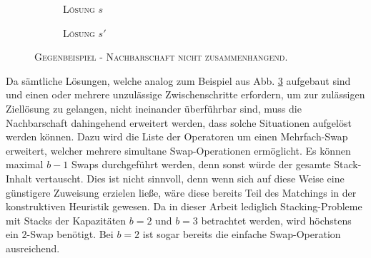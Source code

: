 \begin{figure}[H]
  \begin{subfigure}[b]{0.5\textwidth}
  \centering
    \caption{\textsc{Lösung $s$}}
    \label{fig:counter_a}
  \end{subfigure}
  \hfill
  \begin{subfigure}[b]{0.5\textwidth}
  \centering
    \caption{\textsc{Lösung $s'$}}
    \label{fig:counter_b}
  \end{subfigure}
  \caption{\textsc{Gegenbeispiel - Nachbarschaft nicht zusammenhängend.}}
  \label{fig:counter_example_stacks}
\end{figure}

Da sämtliche Lösungen, welche analog zum Beispiel aus Abb. \ref{fig:counter_example_stacks} aufgebaut sind und einen oder mehrere unzulässige
Zwischenschritte erfordern, um zur zulässigen Ziellösung zu gelangen, nicht ineinander überführbar sind, muss die Nachbarschaft dahingehend erweitert werden, dass solche Situationen aufgelöst werden können.
Dazu wird die Liste der Operatoren um einen Mehrfach-Swap erweitert, welcher mehrere simultane Swap-Operationen
ermöglicht. Es können maximal $b - 1$ Swaps durchgeführt werden, denn sonst würde der gesamte Stack-Inhalt
vertauscht. Dies ist nicht sinnvoll, denn wenn sich auf diese Weise eine günstigere Zuweisung erzielen ließe,
wäre diese bereits Teil des Matchings in der konstruktiven Heuristik gewesen. Da in dieser Arbeit lediglich
Stacking-Probleme mit Stacks der Kapazitäten $b = 2$ und $b = 3$ betrachtet werden, wird höchstens ein $2$-Swap
benötigt. Bei $b = 2$ ist sogar bereits die einfache Swap-Operation ausreichend.

